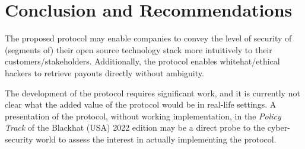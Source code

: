 \section{Conclusion and Recommendations}
\label{sec:conclusion}
The proposed protocol may enable companies to convey the level of security of (segments of) their open source technology stack more intuitively to their customers/stakeholders. Additionally, the protocol enables whitehat/ethical hackers to retrieve payouts directly without ambiguity. 

The development of the protocol requires significant work, and it is currently not clear what the added value of the protocol would be in real-life settings. A presentation of the protocol, without working implementation, in the \textit{Policy Track} of the Blackhat (USA) 2022 edition may be a direct probe to the cyber-security world to assess the interest in actually implementing the protocol.




